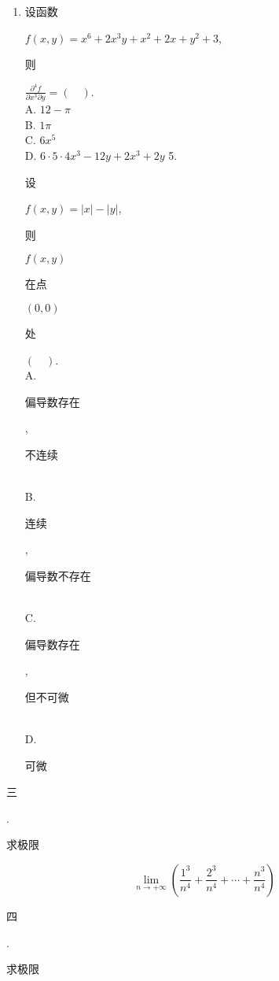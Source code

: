 \documentclass[10pt]{article}
\begin{document}
\begin{enumerate}
  \item \begin{CJK}{UTF8}{mj}设函数\end{CJK} $f(x, y)=x^{6}+2 x^{3} y+x^{2}+2 x+y^{2}+3$, \begin{CJK}{UTF8}{mj}则\end{CJK} $\frac{\partial^{4} f}{\partial x^{3} \partial y}=(\quad)$.\\
A. $12-\pi$\\
B. $1 \pi$\\
C. $6 x^{5}$\\
D. $6 \cdot 5 \cdot 4 x^{3}-12 y+2 x^{3}+2 y$ 5. \begin{CJK}{UTF8}{mj}设\end{CJK} $f(x, y)=|x|-|y|$, \begin{CJK}{UTF8}{mj}则\end{CJK} $f(x, y)$ \begin{CJK}{UTF8}{mj}在点\end{CJK} $(0,0)$ \begin{CJK}{UTF8}{mj}处\end{CJK} $(\quad)$.\\
A. \begin{CJK}{UTF8}{mj}偏导数存在\end{CJK}, \begin{CJK}{UTF8}{mj}不连续\end{CJK}\\
B. \begin{CJK}{UTF8}{mj}连续\end{CJK}, \begin{CJK}{UTF8}{mj}偏导数不存在\end{CJK}\\
C. \begin{CJK}{UTF8}{mj}偏导数存在\end{CJK}, \begin{CJK}{UTF8}{mj}但不可微\end{CJK}\\
D. \begin{CJK}{UTF8}{mj}可微\end{CJK}

\end{enumerate}
\begin{CJK}{UTF8}{mj}三\end{CJK}. \begin{CJK}{UTF8}{mj}求极限\end{CJK}
$$
\lim _{n \rightarrow+\infty}\left(\frac{1^{3}}{n^{4}}+\frac{2^{3}}{n^{4}}+\cdots+\frac{n^{3}}{n^{4}}\right)
$$
\begin{CJK}{UTF8}{mj}四\end{CJK}. \begin{CJK}{UTF8}{mj}求极限\end{CJK}
\end{document}
